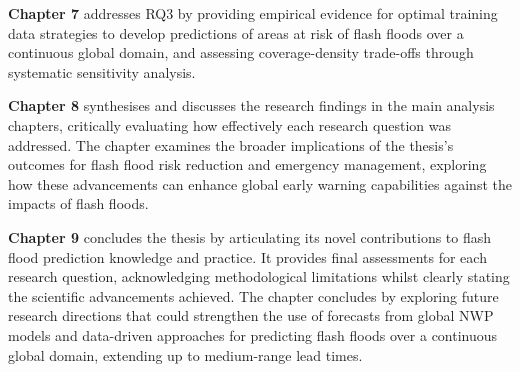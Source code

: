 \textbf{Chapter 7} addresses RQ3 by providing empirical evidence for optimal training data strategies to develop predictions of areas at risk of flash floods over a continuous global domain, and assessing coverage-density trade-offs through systematic sensitivity analysis.

\textbf{Chapter 8} synthesises and discusses the research findings in the main analysis chapters, critically evaluating how effectively each research question was addressed. The chapter examines the broader implications of the thesis's outcomes for flash flood risk reduction and emergency management, exploring how these advancements can enhance global early warning capabilities against the impacts of flash floods. 

\textbf{Chapter 9} concludes the thesis by articulating its novel contributions to flash flood prediction knowledge and practice. It provides final assessments for each research question, acknowledging methodological limitations whilst clearly stating the scientific advancements achieved. The chapter concludes by exploring future research directions that could strengthen the use of forecasts from global NWP models and data-driven approaches for predicting flash floods over a continuous global domain, extending up to medium-range lead times. 